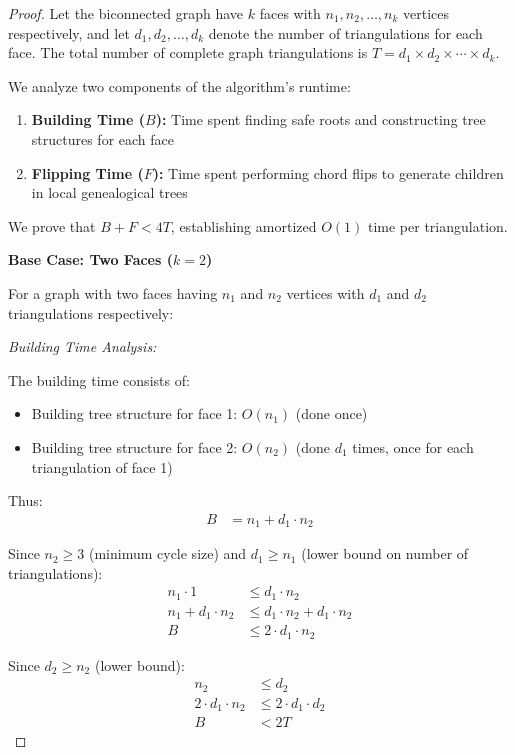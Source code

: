 \documentclass[12pt,a4paper]{article}
\theoremstyle{definition}
\theoremstyle{remark}
\begin{document}
\begin{proof}
Let the biconnected graph have $k$ faces with $n_1, n_2, \ldots, n_k$ vertices respectively, and let $d_1, d_2, \ldots, d_k$ denote the number of triangulations for each face. The total number of complete graph triangulations is $T = d_1 \times d_2 \times \cdots \times d_k$.

We analyze two components of the algorithm's runtime:
\begin{enumerate}
    \item \textbf{Building Time ($B$):} Time spent finding safe roots and constructing tree structures for each face
    \item \textbf{Flipping Time ($F$):} Time spent performing chord flips to generate children in local genealogical trees
\end{enumerate}

We prove that $B + F < 4T$, establishing amortized $O(1)$ time per triangulation.

\vspace{0.3cm}
\noindent\textbf{Base Case: Two Faces ($k = 2$)}

For a graph with two faces having $n_1$ and $n_2$ vertices with $d_1$ and $d_2$ triangulations respectively:

\textit{Building Time Analysis:}

The building time consists of:
\begin{itemize}
    \item Building tree structure for face 1: $O(n_1)$ (done once)
    \item Building tree structure for face 2: $O(n_2)$ (done $d_1$ times, once for each triangulation of face 1)
\end{itemize}

Thus:
\begin{align}
B &= n_1 + d_1 \cdot n_2
\end{align}

Since $n_2 \geq 3$ (minimum cycle size) and $d_1 \geq n_1$ (lower bound on number of triangulations):
\begin{align}
n_1 \cdot 1 &\leq d_1 \cdot n_2 \\
n_1 + d_1 \cdot n_2 &\leq d_1 \cdot n_2 + d_1 \cdot n_2 \\
B &\leq 2 \cdot d_1 \cdot n_2
\end{align}

Since $d_2 \geq n_2$ (lower bound):
\begin{align}
n_2 &\leq d_2 \\
2 \cdot d_1 \cdot n_2 &\leq 2 \cdot d_1 \cdot d_2 \\
B &< 2T
\end{align}


\end{proof}
\end{document}
